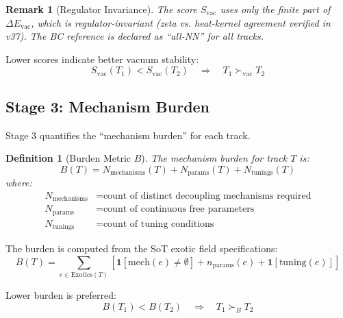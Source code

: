\documentclass[11pt,a4paper]{article}
\newtheorem{definition}{Definition}[section]
\newtheorem{remark}{Remark}[section]
\begin{document}
\begin{remark}[Regulator Invariance]
\label{rmk:regulator}
The score $S_{\text{vac}}$ uses only the \emph{finite} part of $\Delta E_{\text{vac}}$,
which is regulator-invariant (zeta vs. heat-kernel agreement verified in v37).
The BC reference is declared as ``all-NN'' for all tracks.
\end{remark}

Lower scores indicate better vacuum stability:
\begin{equation}
\label{eq:evac-ordering}
S_{\text{vac}}(T_1) < S_{\text{vac}}(T_2) \quad \Rightarrow \quad T_1 \succ_{\text{vac}} T_2
\end{equation}

\subsection{Stage 3: Mechanism Burden}
\label{subsec:stage3}

Stage 3 quantifies the ``mechanism burden'' for each track.

\begin{definition}[Burden Metric $B$]
\label{def:burden}
The mechanism burden for track $T$ is:
\begin{equation}
\label{eq:burden-metric}
B(T) = N_{\text{mechanisms}}(T) + N_{\text{params}}(T) + N_{\text{tunings}}(T)
\end{equation}
where:
\begin{align}
\label{eq:burden-mech}
N_{\text{mechanisms}} &= \text{count of distinct decoupling mechanisms required} \\
\label{eq:burden-params}
N_{\text{params}} &= \text{count of continuous free parameters} \\
\label{eq:burden-tuning}
N_{\text{tunings}} &= \text{count of tuning conditions}
\end{align}
\end{definition}

The burden is computed from the SoT exotic field specifications:
\begin{equation}
\label{eq:burden-from-sot}
B(T) = \sum_{e \in \text{Exotics}(T)} \left[ \mathbf{1}[\text{mech}(e) \neq \emptyset] + n_{\text{params}}(e) + \mathbf{1}[\text{tuning}(e)]\right]
\end{equation}

Lower burden is preferred:
\begin{equation}
\label{eq:burden-ordering}
B(T_1) < B(T_2) \quad \Rightarrow \quad T_1 \succ_{B} T_2
\end{equation}
\end{document}
